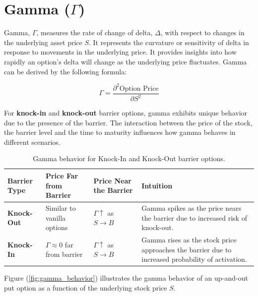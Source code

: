 \section{Gamma (\(\Gamma\))}

Gamma, $\Gamma$, measures the rate of change of delta, $\Delta$, with respect to changes in the underlying asset price $S$. It represents the curvature or sensitivity of delta in response to movements in the underlying price. It provides insights into how rapidly an option's delta will change as the underlying price fluctuates. Gamma can be derived by the following formula:

\begin{equation}
	\Gamma = \frac{\partial^2 \text{Option Price}}{\partial S^2}
\end{equation}

For \textbf{knock-in} and \textbf{knock-out} barrier options, gamma exhibits unique behavior due to the presence of the barrier. The interaction between the price of the stock, the barrier level and the time to maturity influences how gamma behaves in different scenarios.

\begin{center}
	\begin{table}[H]
		\begin{tabular}{ | m{3cm} | m{5cm}| m{4cm} | m{4cm}|} 
			\hline
			\textbf{Barrier Type} & \textbf{Price Far from Barrier} & \textbf{Price Near the Barrier} & \textbf{Intuition}  \\ 
			\hline
			\textbf{Knock-Out} & Similar to vanilla options     & $\Gamma \uparrow$ as $S \to B$  & Gamma spikes as the price nears the barrier due to increased risk of knock-out. \\ 
			\hline
			\textbf{Knock-In}    & $\Gamma \approx 0$ far from barrier   & $\Gamma \uparrow$ as $S \to B$  & Gamma rises as the stock price approaches the barrier due to increased probability of activation. \\ 
			\hline
		\end{tabular}
\caption{Gamma behavior for Knock-In and Knock-Out barrier options.}
\label{tab:gamma_barrier_options}
	\end{table}
\end{center}

Figure (\ref{fig:gamma_behavior}) illustrates the gamma behavior of an up-and-out put option as a function of the underlying stock price $S$. 

